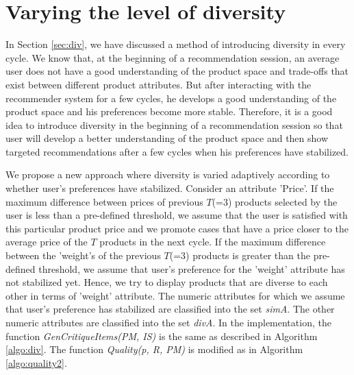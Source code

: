 \section{Varying the level of diversity}
\label{sec:div2}
In Section \ref{sec:div}, we have discussed a method of introducing diversity in every cycle.
We know that, at the beginning of a recommendation session, an average user does not have a good understanding of the product space and trade-offs that exist between different product attributes.
But after interacting with the recommender system for a few cycles, he develops a good understanding of the product space and his preferences become more stable.
Therefore, it is a good idea to introduce diversity in the beginning of a recommendation session so that user will develop a better understanding of the product space and then show targeted recommendations after a few cycles when his preferences have stabilized.

We propose a new approach where diversity is varied adaptively according to whether user's preferences have stabilized.
Consider an attribute 'Price'.
If the maximum difference between prices of previous $T$(=3) products selected by the user is less than a pre-defined threshold, we assume that the user is satisfied with this particular product price and we promote cases that have a price closer to the average price of the $T$ products in the next cycle.
If the maximum difference between the 'weight's of the previous $T$(=3) products is greater than the pre-defined threshold, we assume that user's preference for the 'weight' attribute has not stabilized yet. 
Hence, we try to display products that are diverse to each other in terms of 'weight' attribute.
The numeric attributes for which we assume that user's preference has stabilized are classified into the set \textit{simA}.
The other numeric attributes are classified into the set \textit{divA}.
In the implementation, the function \textit{GenCritiqueItems(PM, IS)} is the same as described in Algorithm \ref{algo:div}.
The function \textit{Quality(p, R, PM)} is modified as in Algorithm \ref{algo:quality2}.

